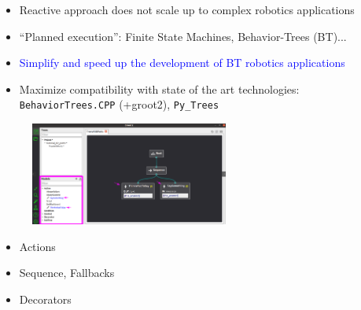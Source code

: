 \documentclass[notes,slidesec,a4]{seminar}
\begin{document}
\begin{hslide}
  \vspace{-0.3cm}
  \vspace{-0.4cm}
\begin{itemize}
\item Reactive approach does not scale up to complex robotics applications 
\item ``Planned execution'': Finite State Machines, Behavior-Trees (BT)...
\item \textcolor{blue}{Simplify and speed up the development of BT robotics applications}
\item Maximize compatibility with state of the art technologies:\\
  \texttt{BehaviorTrees.CPP} (+groot2), \texttt{Py\_Trees}
\end{itemize}
\begin{minipage}[t]{7cm}
  \vspace{-0.5cm}
  \begin{figure}
      \includegraphics[width=6.5cm]{figs/groot2.png}
  \end{figure}
\end{minipage}
\begin{minipage}[t]{5cm}
  \begin{itemize}
  \item Actions
  \item Sequence, Fallbacks
  \item Decorators
  \end{itemize}
\end{minipage}
\end{hslide}
\end{document}
